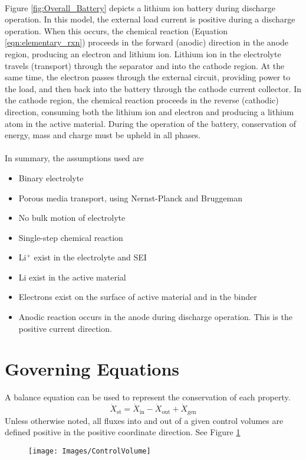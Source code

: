 \documentclass[12pt]{article}
\begin{document}
	\\
	Figure \ref{fig:Overall_Battery} depicts a lithium ion battery during discharge operation. In this model, the external load current is positive during a discharge operation. When this occurs, the chemical reaction (Equation \ref{eqn:elementary_rxn}) proceeds in the forward (anodic) direction in the anode region, producing an electron and lithium ion. Lithium ion in the electrolyte travels (transport)  through the separator and into the cathode region. At the same time, the electron passes through the external circuit, providing power to the load, and then back into the battery through the cathode current collector. In the cathode region, the chemical reaction proceeds in the reverse (cathodic) direction, consuming both the lithium ion and electron and producing a lithium atom in the active material. During the operation of the battery, conservation of energy, mass and charge must be upheld in all phases.\\
	\\
	In summary, the assumptions used are
	\begin{itemize}
		\item Binary electrolyte
		\item Porous media transport, using Nernst-Planck and Bruggeman
		\item No bulk motion of electrolyte
		\item Single-step chemical reaction
		\item Li$^+$ exist in the electrolyte and SEI
		\item Li exist in the active material
		\item Electrons exist on the surface of active material and in the binder
		\item Anodic reaction occurs in the anode during discharge operation. This is the positive current direction.
	\end{itemize}
\section{Governing Equations}
	A balance equation can be used to represent the conservation of each property. 
	\begin{equation} \label{eqn:balance}
		\dot{X}_\text{st} = \dot{X}_\text{in} - \dot{X}_\text{out} + \dot{X}_\text{gen}
	\end{equation}
	Unless otherwise noted, all fluxes into and out of a given control volumes are defined positive in the positive coordinate direction. See Figure \ref{fig:ControlVolume}\\
	\begin{figure} [h]
		\centering
		\texttt{[image: Images/ControlVolume]}
		\caption{}
		\label{fig:ControlVolume}
	\end{figure}
\end{document}
